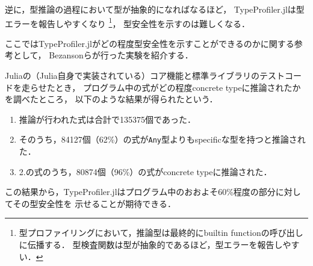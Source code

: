 逆に，型推論の過程において型が抽象的になればなるほど，
TypeProfiler.jlは型エラーを報告しやすくなり
\footnote{
  型プロファイリングにおいて，推論型は最終的にbuiltin functionの呼び出しに伝播する．
  型検査関数は型が抽象的であるほど，型エラーを報告しやすい．
}，
型安全性を示すのは難しくなる．

ここではTypeProfiler.jlがどの程度型安全性を示すことができるのかに関する参考として，
Bezansonらが行った実験\cite{julia-2012}を紹介する．

Juliaの（Julia自身で実装されている）コア機能と標準ライブラリのテストコードを走らせたとき，
プログラム中の式がどの程度concrete typeに推論されたかを調べたところ，
以下のような結果が得られたという\footnotemark．

\begin{enumerate}
  \item 推論が行われた式は合計で135375個であった．
  \item そのうち，84127個（62\%）の式が\texttt{Any}型よりもspecificな型を持つと推論された．
  \item 2.の式のうち，80874個（96\%）の式がconcrete typeに推論された．
\end{enumerate}

この結果から，TypeProfiler.jlはプログラム中のおおよそ60\%程度の部分に対してその型安全性を
示せることが期待できる．

